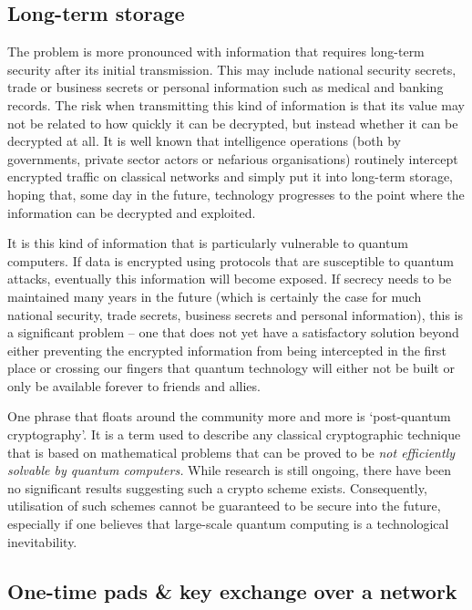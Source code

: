 \documentclass[twocolumn, aps, rmp, amsmath, amssymb, nofootinbib, superscriptaddress, longbibliography, floatfix, table-of-contents, eqsecnum]{revtex4-2}
\begin{document}
\subsection{Long-term storage}

The problem is more pronounced with information that requires long-term security after its initial transmission. This may include national security secrets, trade or business secrets or personal information such as medical and banking records. The risk when transmitting this kind of information is that its value may not be related to how quickly it can be decrypted, but instead whether it can be decrypted at all. It is well known that intelligence operations (both by governments, private sector actors or nefarious organisations) routinely intercept encrypted traffic on classical networks and simply put it into long-term storage, hoping that, some day in the future, technology progresses to the point where the information can be decrypted and exploited. 

It is this kind of information that is particularly vulnerable to quantum computers. If data is encrypted using protocols that are susceptible to quantum attacks, eventually this information will become exposed. If secrecy needs to be maintained many years in the future (which is certainly the case for much national security, trade secrets, business secrets and personal information), this is a significant problem -- one that does not yet have a satisfactory solution beyond either preventing the encrypted information from being intercepted in the first place or crossing our fingers that quantum technology will either not be built or only be available forever to friends and allies.  

One phrase that floats around the community more and more is `post-quantum cryptography'. It is a term used to describe any classical cryptographic technique that is based on mathematical problems that can be proved to be \textit{not efficiently solvable by quantum computers.} While research is still ongoing, there have been no significant results suggesting such a crypto scheme exists. Consequently, utilisation of such schemes cannot be guaranteed to be secure into the future, especially if one believes that large-scale quantum computing is a technological inevitability. 

\subsection{One-time pads \& key exchange over a network}
\end{document}
